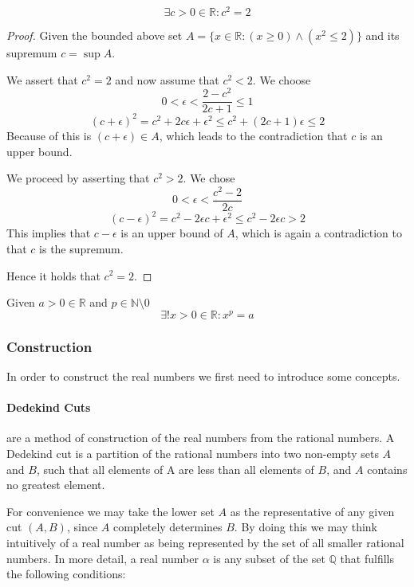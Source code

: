 \begin{proposition}
   \[\exists c > 0 \in \mathbb{R}: c^2 = 2\]
\end{proposition}
\begin{proof}
   Given the bounded above set \(A = \{x \in \mathbb{R}: (x \geq 0) \land (x^2 \leq 2)\}\) and its supremum \(c = \sup A\).

   We assert that \(c^2 = 2\) and now assume that \(c^2 < 2\).
   We choose
   \[0 < \epsilon < \frac{2 - c^2}{2c + 1} \leq 1\]
   \[(c + \epsilon)^2 = c^2 + 2c\epsilon + \epsilon^2 \leq c^2 + (2c + 1)\epsilon \leq 2\]
   Because of this is \((c + \epsilon) \in A\), which leads to the contradiction that \(c\) is an upper bound.

   We proceed by asserting that \(c^2 > 2\).
   We chose
   \[0 < \epsilon < \frac{c^2 - 2}{2c}\]
   \[(c - \epsilon)^2 = c^2 - 2\epsilon c + \epsilon^2 \leq c^2 - 2\epsilon c > 2\]
   This implies that \(c - \epsilon\) is an upper bound of \(A\), which is again a contradiction to that \(c\) is the supremum.

   Hence it holds that \(c^2 = 2\).
\end{proof}
\begin{remark}
   Given \(a > 0 \in \mathbb{R}\) and \(p \in \mathbb{N}\setminus 0\)
   \[\exists! x > 0 \in \mathbb{R}: x^p = a\]
\end{remark}

\subsubsection{Construction}
In order to construct the real numbers we first need to introduce some concepts.

\paragraph{Dedekind Cuts} are a method of construction of the real numbers from the rational numbers.
A Dedekind cut is a partition of the rational numbers into two non-empty sets \(A\) and \(B\), such that all elements of A are less than all elements of \(B\), and \(A\) contains no greatest element.

For convenience we may take the lower set \(A\) as the representative of any given cut \((A,B)\), since \(A\) completely determines \(B\).
By doing this we may think intuitively of a real number as being represented by the set of all smaller rational numbers.
In more detail, a real number \(\alpha\) is any subset of the set \(\mathbb{Q}\) that fulfills the following conditions:

